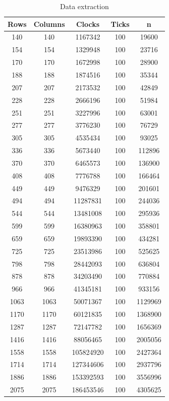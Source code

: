 \documentclass[12pt,a4paper]{report}
\begin{document}
\begin{center}

\begin{table}[ht]
\caption{\label{tab:table-name} Data extraction}
\centering
\begin{tabular}{ccccc}
\hline
\hline
Rows & Columns & Clocks    & Ticks & n       \\ \hline
140  & 140     & 1167342   & 100   & 19600   \\ \hline
154  & 154     & 1329948   & 100   & 23716   \\ \hline
170  & 170     & 1672998   & 100   & 28900   \\ \hline
188  & 188     & 1874516   & 100   & 35344   \\ \hline
207  & 207     & 2173532   & 100   & 42849   \\ \hline
228  & 228     & 2666196   & 100   & 51984   \\ \hline
251  & 251     & 3227996   & 100   & 63001   \\ \hline
277  & 277     & 3776230   & 100   & 76729   \\ \hline
305  & 305     & 4535434   & 100   & 93025   \\ \hline
336  & 336     & 5673440   & 100   & 112896  \\ \hline
370  & 370     & 6465573   & 100   & 136900  \\ \hline
408  & 408     & 7776788   & 100   & 166464  \\ \hline
449  & 449     & 9476329   & 100   & 201601  \\ \hline
494  & 494     & 11287831  & 100   & 244036  \\ \hline
544  & 544     & 13481008  & 100   & 295936  \\ \hline
599  & 599     & 16380963  & 100   & 358801  \\ \hline
659  & 659     & 19893390  & 100   & 434281  \\ \hline
725  & 725     & 23513986  & 100   & 525625  \\ \hline
798  & 798     & 28442093  & 100   & 636804  \\ \hline
878  & 878     & 34203490  & 100   & 770884  \\ \hline
966  & 966     & 41345181  & 100   & 933156  \\ \hline
1063 & 1063    & 50071367  & 100   & 1129969 \\ \hline
1170 & 1170    & 60121835  & 100   & 1368900 \\ \hline
1287 & 1287    & 72147782  & 100   & 1656369 \\ \hline
1416 & 1416    & 88056465  & 100   & 2005056 \\ \hline
1558 & 1558    & 105824920 & 100   & 2427364 \\ \hline
1714 & 1714    & 127344606 & 100   & 2937796 \\ \hline
1886 & 1886    & 153392593 & 100   & 3556996 \\ \hline
2075 & 2075    & 186453546 & 100   & 4305625 \\ \hline
\end{tabular}
\end{table}

\end{center}
\end{document}
